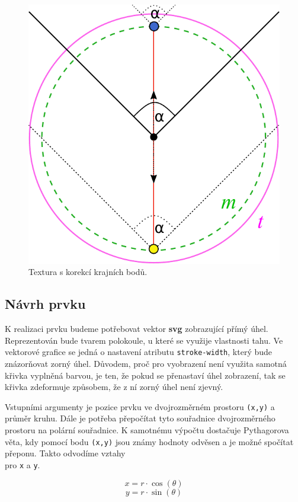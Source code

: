 \begin{figure}[h]
	\label{img:field_vision_implementation}
	\centering
	\includegraphics[scale=1.0,angle=0,width=0.45\linewidth]{obrazky-figures/field_vision_implementation}
	\caption{Textura s korekcí krajních bodů.}
\end{figure}


\newpage

\subsection{Návrh prvku}
K realizaci prvku budeme potřebovat vektor \textbf{svg} zobrazující přímý úhel. Reprezentován bude tvarem polokoule, u které se využije vlastnosti tahu. Ve vektorové grafice se jedná o nastavení atributu \texttt{stroke-width}, který bude znázorňovat zorný úhel. Důvodem, proč pro vyobrazení  není využita samotná křivka vyplněná barvou, je ten, že pokud se přenastaví úhel zobrazení, tak se křivka zdeformuje způsobem, že z ní zorný úhel není zjevný.

Vstupními argumenty je pozice prvku ve dvojrozměrném prostoru \texttt{(x,y)} a průměr kruhu. Dále je potřeba přepočítat tyto souřadnice dvojrozměrného prostoru na polární souřadnice. K samotnému výpočtu dostačuje Pythagorova věta, kdy pomocí bodu \texttt{(x,y)} jsou známy hodnoty odvěsen a je možné spočítat přeponu. \cite{geometrie} Takto odvodíme vztahy \\pro \texttt{x} a \texttt{y}.


 $$ x = r\cdot\cos(\theta) $$ 
 $$ y = r\cdot\sin(\theta) $$  






\newpage



